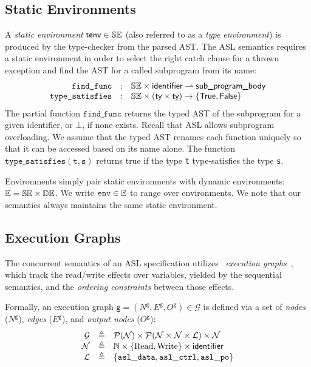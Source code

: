 \documentclass{book}
\newcommand\xgraph[0]{\textsf{g}}
\newcommand\Nodes[0]{\mathcal{N}}
\newcommand\Read[0]{\text{Read}}
\newcommand\Write[0]{\text{Write}}
\newcommand\Labels[0]{\mathcal{L}}
\newcommand\XGraphs[0]{\mathcal{G}}
\newcommand\tenv[0]{\textsf{tenv}}
\newcommand\vals[0]{\mathcal{V}}
\newcommand\findfunc[0]{\texttt{find\_func}}
\newcommand\typesatisfies[0]{\texttt{type\_satisfies}}
\newcommand\env[0]{\texttt{env}}
\begin{document}

\subsection{Static Environments}

A \emph{static environment} $\tenv \in \staticenvs$ (also referred to as a \emph{type environment})
is produced by the type-checker from the parsed AST.
%
The ASL semantics requires a static environment in order to select the right catch clause for a thrown exception
and find the AST for a called subprogram from its name:
\[
  \begin{array}{rcl}
    \findfunc       &:& \staticenvs \times \identifier \partialto \subprogrambody\\
    \typesatisfies  &:& \staticenvs \times (\ty \times \ty) \rightarrow \{\True, \False\}
  \end{array}
\]
The partial function $\findfunc$ returns the typed AST of the subprogram for a given identifier, or $\bot$,
if none exists. Recall that ASL allows subprogram overloading.
We assume that the typed AST renames each function uniquely so that it can be accessed based
on its name alone.
%
The function $\typesatisfies(\texttt{t}, \texttt{s})$ returns true if the type \texttt{t} type-satisfies the type \texttt{s}.

Environments simply pair static environments with dynamic environments:
$\mathbb{E} = \mathbb{SE} \times \mathbb{DE}$. We write $\env \in \envs$ to range over environments.
%
We note that our semantics always maintains the same static environment.

\subsection{Execution Graphs}

The concurrent semantics of an ASL specification utilizes \herd\ \emph{execution graphs}~\cite{AlglaveDGHM21},
which track the read/write effects over variables, yielded by the sequential semantics, and the \emph{ordering constraints}
between those effects.

Formally, an execution graph $\xgraph = (N^\xgraph, E^\xgraph, O^\xgraph) \in \XGraphs$
is defined via a set of \emph{nodes} ($N^\xgraph$), \emph{edges} ($E^\xgraph$), and \emph{output nodes} ($O^\xgraph$):
\[
\begin{array}{rcl}
  \XGraphs   	    &\triangleq& \pow{\Nodes} \times \pow{\Nodes \times \Nodes \times \Labels} \times \Nodes  \\
  \Nodes            &\triangleq& \N \times \{ \Read, \Write \} \times \identifier \\
  \Labels           &\triangleq& \{ \asldata, \aslctrl, \aslpo \}
\end{array}
\]
\end{document}
